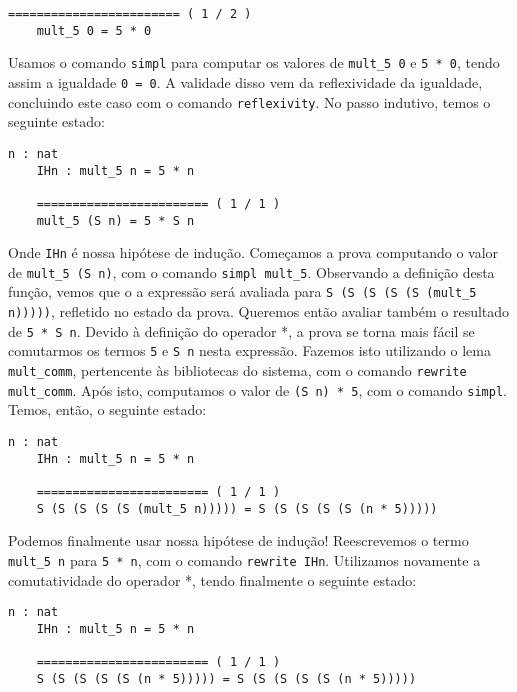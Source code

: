 \begin{lstlisting}[basicstyle=\small]
    ======================== ( 1 / 2 )
    mult_5 0 = 5 * 0

\end{lstlisting}

Usamos o comando \texttt{simpl} para computar os valores de \texttt{mult\_5 0} e
\texttt{5 * 0}, tendo assim a igualdade \texttt{0 = 0}. A validade disso vem da
reflexividade da igualdade, concluindo este caso com o comando
\texttt{reflexivity}. No passo indutivo, temos o seguinte estado:


\begin{lstlisting}[basicstyle=\small]
    n : nat
    IHn : mult_5 n = 5 * n

    ======================== ( 1 / 1 )
    mult_5 (S n) = 5 * S n
\end{lstlisting}

Onde \texttt{IHn} é nossa hipótese de indução. Começamos a prova computando o
valor de \texttt{mult\_5 (S n)}, com o comando \texttt{simpl mult\_5}.
Observando a definição desta função, vemos que o a expressão será avaliada para
\texttt{S (S (S (S (S (mult\_5 n)))))}, refletido no estado da prova. Queremos
então avaliar também o resultado de \texttt{5 * S n}. Devido à definição do
operador *, a prova se torna mais fácil se comutarmos os termos \texttt{5} e
\texttt{S n} nesta expressão. Fazemos isto utilizando o lema
\texttt{mult\_comm}, pertencente às bibliotecas do sistema, com o comando
\texttt{rewrite mult\_comm}. Após isto, computamos o valor de \texttt{(S n) *
    5}, com o comando \texttt{simpl}. Temos, então, o seguinte estado:

\begin{lstlisting}[basicstyle=\small]
    n : nat
    IHn : mult_5 n = 5 * n

    ======================== ( 1 / 1 )
    S (S (S (S (S (mult_5 n))))) = S (S (S (S (S (n * 5)))))
\end{lstlisting}

Podemos finalmente usar nossa hipótese de indução! Reescrevemos o termo
\texttt{mult\_5 n} para \texttt{5 * n}, com o comando \texttt{rewrite IHn}.
Utilizamos novamente a comutatividade do operador *, tendo finalmente o seguinte
estado:

\begin{lstlisting}[basicstyle=\small]
    n : nat
    IHn : mult_5 n = 5 * n

    ======================== ( 1 / 1 )
    S (S (S (S (S (n * 5))))) = S (S (S (S (S (n * 5)))))
\end{lstlisting}

